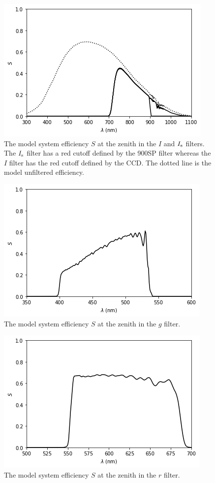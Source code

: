 \begin{figure}
\begin{center}
\includegraphics[width=0.7\linewidth]{figures/huitzi-f20-S-JC-IIs.png}
\medskip
\caption{The model system efficiency $S$ at the zenith in the $I$ and $\mbox{$I_\mathrm{s}$}$ filters. The $\mbox{$I_\mathrm{s}$}$ filter has a red cutoff defined by the 900SP filter whereas the $I$ filter has the red cutoff defined by the CCD. The dotted line is the model unfiltered efficiency.}
\label{figure:huitzi-f20-S-JC-IIs}
\end{center}
\end{figure}

\begin{figure}
\begin{center}
\includegraphics[width=0.7\linewidth]{figures/huitzi-f20-S-g.png}
\medskip
\caption{The model system efficiency $S$ at the zenith in the $g$ filter.}
\end{center}
\end{figure}

\begin{figure}
\begin{center}
\includegraphics[width=0.7\linewidth]{figures/huitzi-f20-S-r.png}
\medskip
\caption{The model system efficiency $S$ at the zenith in the $r$ filter.}
\end{center}
\end{figure}

